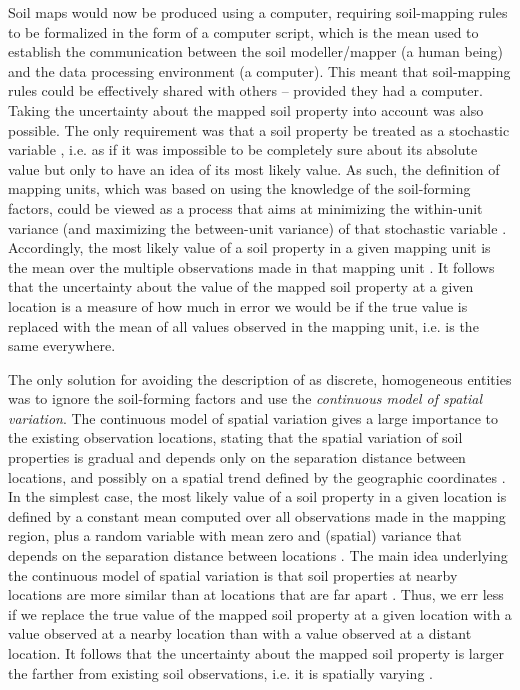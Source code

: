 Soil maps would now be produced using a computer, requiring soil-mapping rules to be formalized in the 
form of a computer script, which is the mean used to establish the communication between the soil 
modeller/mapper (a human being) and the data processing environment (a computer). This meant that 
soil-mapping rules could be effectively shared with others -- provided they had a computer. Taking the 
uncertainty about the mapped soil property into account was also possible. The only requirement was that a 
soil property be treated as a stochastic variable \cite{Cressie1993}, i.e. as if it was impossible to be 
completely sure about its absolute value but only to have an idea of its most likely value. As such, the 
definition of mapping units, which was based on using the knowledge of the soil-forming factors, could be 
viewed as a process that aims at minimizing the within-unit variance (and maximizing the between-unit
variance) of that stochastic variable \cite{VoltzEtAl1990}. Accordingly, the most likely value of a
soil property in a given mapping unit is the mean over the multiple observations made in that 
mapping unit \cite{VoltzEtAl1990,Cressie1993}. It follows that the uncertainty about the value of
the mapped soil property at a given location is a measure of how much in error we would be if the true
value is replaced with the mean of all values observed in the mapping unit, i.e. is the same 
everywhere.

The only solution for avoiding the description of  as discrete, homogeneous entities 
was to ignore the soil-forming factors and use the \emph{continuous model of spatial variation}.
The continuous model of spatial variation gives a large importance to the existing observation 
locations, stating that the spatial variation of soil properties is gradual and depends only on the 
separation distance between locations, and possibly on a spatial trend defined by the geographic 
coordinates \cite{WebsterEtAl1990,Cressie1993}. In the simplest case, the most likely value of a 
soil property in a given location is defined by a constant mean computed over all observations made 
in the mapping region, plus a random variable with mean zero and (spatial) variance that depends on 
the separation distance between locations \cite{Cressie1993}. The main idea underlying the 
continuous model of spatial variation is that soil properties at nearby locations are more similar 
than at locations that are far apart \cite{WebsterEtAl1990}. Thus, we err less if we replace the
true value of the mapped soil property at a given location with a value observed at a nearby 
location than with a value observed at a distant location. It follows that the uncertainty about 
the mapped soil property is larger the farther from existing soil observations, i.e. it is 
spatially varying \cite{Cressie1993}.


